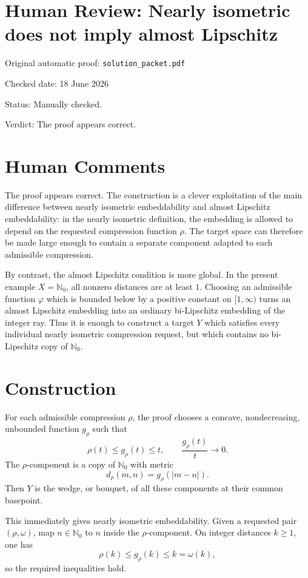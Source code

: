 \documentclass[11pt]{article}
\begin{document}
\section*{Human Review: Nearly isometric does not imply almost Lipschitz}

\noindent Original automatic proof: \texttt{solution\_packet.pdf}

\noindent Checked date: 18 June 2026

\noindent Status: Manually checked.

\noindent Verdict: The proof appears correct.

\section*{Human Comments}

The proof appears correct.  The construction is a clever exploitation of the
main difference between nearly isometric embeddability and almost Lipschitz
embeddability: in the nearly isometric definition, the embedding is allowed to
depend on the requested compression function \(\rho\).  The target space can
therefore be made large enough to contain a separate component adapted to
each admissible compression.

By contrast, the almost Lipschitz condition is more global.  In the present
example \(X=\mathbb N_0\), all nonzero distances are at least \(1\).  Choosing
an admissible function \(\varphi\) which is bounded below by a positive
constant on \([1,\infty)\) turns an almost Lipschitz embedding into an
ordinary bi-Lipschitz embedding of the integer ray.  Thus it is enough to
construct a target \(Y\) which satisfies every individual nearly isometric
compression request, but which contains no bi-Lipschitz copy of
\(\mathbb N_0\).

\section*{Construction}

For each admissible compression \(\rho\), the proof chooses a concave,
nondecreasing, unbounded function \(g_\rho\) such that
\[
  \rho(t)\leq g_\rho(t)\leq t,
  \qquad
  \frac{g_\rho(t)}{t}\to0.
\]
The \(\rho\)-component is a copy of \(\mathbb N_0\) with metric
\[
  d_\rho(m,n)=g_\rho(|m-n|).
\]
Then \(Y\) is the wedge, or bouquet, of all these components at their common
basepoint.

This immediately gives nearly isometric embeddability.  Given a requested
pair \((\rho,\omega)\), map \(n\in\mathbb N_0\) to \(n\) inside the
\(\rho\)-component.  On integer distances \(k\geq1\), one has
\[
  \rho(k)\leq g_\rho(k)\leq k=\omega(k),
\]
so the required inequalities hold.
\end{document}
